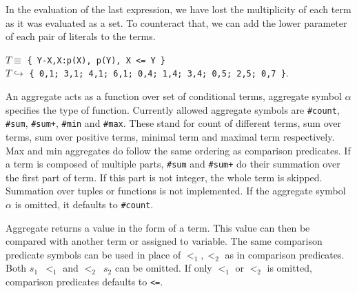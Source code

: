 \begin{example}
    In the evaluation of the last expression, we have lost the multiplicity of each term
    as it was evaluated as a set. To counteract that, we can add the lower parameter
    of each pair of literals to the terms.
    \begin{center}
        $T \equiv$ \texttt{\{ Y-X,X:p(X), p(Y), X <= Y \}}\\  %
        $T\hookrightarrow$ \texttt{\{ 0,1; 3,1; 4,1; 6,1; 0,4; 1,4; 3,4; 0,5; 2,5; 0,7 \}}.  %
    \end{center}
\end{example}

An aggregate acts as a function over set of conditional terms,
aggregate symbol $\alpha$ specifies the type of function.
Currently allowed aggregate symbols are \texttt{\#count},
\texttt{\#sum}, \texttt{\#sum+}, \texttt{\#min} and \texttt{\#max}.
These stand for count of different terms, sum over terms, sum over positive terms,
minimal term and maximal term respectively.
Max and min aggregates do follow the same ordering as comparison predicates.
If a term is composed of multiple parts, \texttt{\#sum} and \texttt{\#sum+}
do their summation over
the first part of term. If this part is not integer, the whole term is skipped.
Summation over tuples or functions is not implemented.
If the aggregate symbol $\alpha$ is omitted, it defaults to \texttt{\#count}.

Aggregate returns a value in the form of a term. This value can then be compared
with another term or assigned to variable. The same comparison predicate symbols
can be used in place of $<_1, <_2$ as in comparison predicates.
Both \texttt{$s_1$ $<_1$} and \texttt{$<_2$ $s_2$} can be omitted.
If only $<_1$ or $<_2$ is omitted, comparison predicates defaults to \texttt{<=}.

